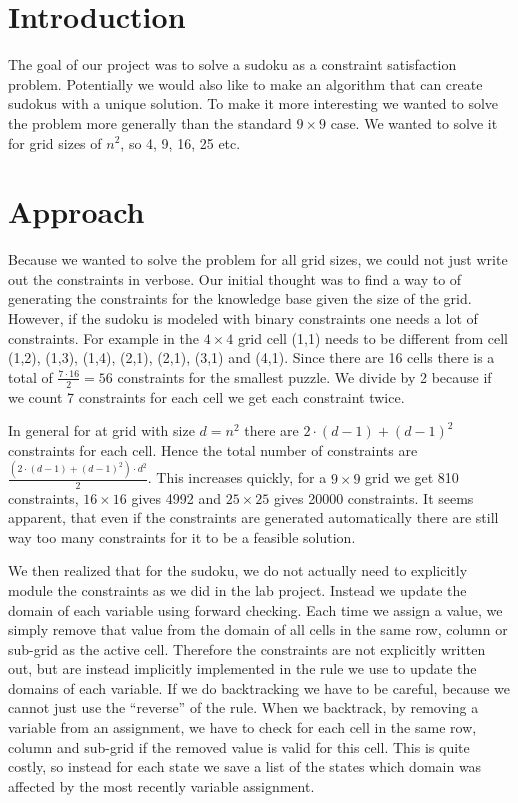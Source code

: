 \documentclass[12pt, a4paper, titlepage]{article}
\begin{document}

\maketitlepage

\section*{Introduction}
The goal of our project was to solve a sudoku as a constraint satisfaction problem. Potentially we would also like to make an algorithm that can create sudokus with a unique solution. To make it more interesting we wanted to solve the problem more generally than the standard $9 \times 9$ case. We wanted to solve it for grid sizes of $n^2$, so 4, 9, 16, 25 etc.

\section*{Approach}
Because we wanted to solve the problem for all grid sizes, we could not just write out the constraints in verbose. Our initial thought was to find a way to of generating the constraints for the knowledge base given the size of the grid. However, if the sudoku is modeled with binary constraints one needs a lot of constraints. For example in the $4 \times 4$ grid cell (1,1) needs to be different from cell (1,2), (1,3), (1,4), (2,1), (2,1), (3,1) and (4,1). Since there are 16 cells there is a total of $\frac{7\cdot 16}{2} = 56$ constraints for the smallest puzzle. We divide by 2 because if we count 7 constraints for each cell we get each constraint twice. 

In general for at grid with size $d=n^2$ there are $2 \cdot (d-1) + (d-1)^2$ constraints for each cell. Hence the total number of constraints are $\frac{(2 \cdot (d-1) + (d-1)^2) \cdot d^2}{2}$. This increases quickly, for a $9 \times 9$ grid we get 810 constraints, $16 \times 16$ gives 4992 and $25 \times 25$ gives 20000 constraints. It seems apparent, that even if the constraints are generated automatically there are still way too many constraints for it to be a feasible solution.  

We then realized that for the sudoku, we do not actually need to explicitly module the constraints as we did in the lab project. Instead we update the domain of each variable using forward checking. Each time we assign a value, we simply remove that value from the domain of all cells in the same row, column or sub-grid as the active cell. Therefore the constraints are not explicitly written out, but are instead implicitly implemented in the rule we use to update the domains of each variable. If we do backtracking we have to be careful, because we cannot just use the ``reverse'' of the rule. When we backtrack, by removing a variable from an assignment, we have to check for each cell in the same row, column and sub-grid if the removed value is valid for this cell. This is quite costly, so instead for each state we save a list of the states which domain was affected by the most recently variable assignment. 
\end{document}
